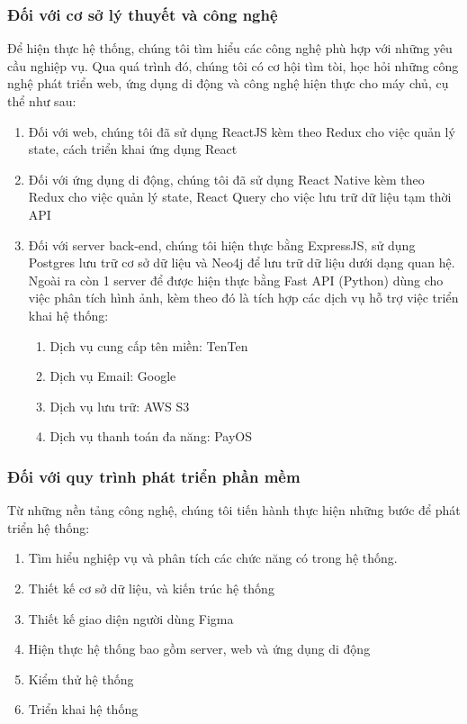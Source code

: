 \subsubsection{Đối với cơ sở lý thuyết và công nghệ}
Để hiện thực hệ thống, chúng tôi tìm hiểu các công nghệ phù hợp với những yêu cầu nghiệp vụ. Qua quá trình đó, chúng tôi có cơ hội tìm tòi, học hỏi những công nghệ phát triển web, ứng dụng di động và công nghệ hiện thực cho máy chủ, cụ thể như sau:
\begin{enumerate}[-]
    \item Đối với web, chúng tôi đã sử dụng ReactJS kèm theo Redux cho việc quản lý state, cách triển khai ứng dụng React 
    \item Đối với ứng dụng di động, chúng tôi đã sử dụng React Native kèm theo Redux cho việc quản lý state, React Query cho việc lưu trữ dữ liệu tạm thời API
    \item  Đối với server back-end, chúng tôi hiện thực bằng ExpressJS, sử dụng Postgres lưu trữ cơ sở dữ liệu và Neo4j để lưu trữ dữ liệu dưới dạng quan hệ. Ngoài ra còn 1 server để được hiện thực bằng Fast API (Python) dùng cho việc phân tích hình ảnh, kèm theo đó là tích hợp các dịch vụ hỗ trợ việc triển khai hệ thống:
    \begin{enumerate}[+]
        \item Dịch vụ cung cấp tên miền: TenTen
        \item Dịch vụ Email: Google
        \item Dịch vụ lưu trữ: AWS S3
        \item Dịch vụ thanh toán đa năng: PayOS
    \end{enumerate}
\end{enumerate}
\subsubsection{Đối với quy trình phát triển phần mềm}
Từ những nền tảng công nghệ, chúng tôi tiến hành thực hiện những bước để phát triển hệ thống:
\begin{enumerate}[-]
    \item Tìm hiểu nghiệp vụ và phân tích các chức năng có trong hệ thống.
    \item Thiết kế cơ sở dữ liệu, và kiến trúc hệ thống
    \item Thiết kế giao diện người dùng Figma
    \item Hiện thực hệ thống bao gồm server, web và ứng dụng di động
    \item Kiểm thử hệ thống
    \item Triển khai hệ thống
\end{enumerate}
